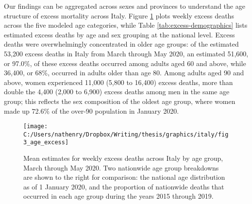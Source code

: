 \documentclass[
]{article}
\begin{document}
Our findings can be aggregated across sexes and provinces to understand the age structure of excess mortality across Italy. Figure \ref{fig:age-excess} plots weekly excess deaths across the five modeled age categories, while Table \ref{tab:excess-demographics} lists estimated excess deaths by age and sex grouping at the national level. Excess deaths were overwhelmingly concentrated in older age groups: of the estimated 53,200 excess deaths in Italy from March through May 2020, an estimated 51,600, or 97.0\%, of these excess deaths occurred among adults aged 60 and above, while 36,400, or 68\%, occurred in adults older than age 80. Among adults aged 90 and above, women experienced 11,000 (5,800 to 16,400) excess deaths, more than double the 4,400 (2,000 to 6,900) excess deaths among men in the same age group; this reflects the sex composition of the oldest age group, where women made up 72.6\% of the over-90 population in January 2020.

\begin{figure}[!hbt]

{\centering \texttt{[image: C:/Users/nathenry/Dropbox/Writing/thesis/graphics/italy/fig3\_age\_excess]} 

}

\caption{Mean estimates for weekly excess deaths across Italy by age group, March through May 2020. Two nationwide age group breakdowns are shown to the right for comparison: the national age distribution as of 1 January 2020, and the proportion of nationwide deaths that occurred in each age group during the years 2015 through 2019.}\label{fig:age-excess}
\end{figure}
\end{document}
